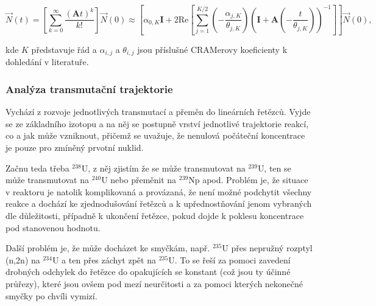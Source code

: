 $$ \vec{N}(t) = \left [ \sum_{k=0}^\infty \dfrac{(\textbf{A}t)^k}{k!} \right ] \vec{N}(0) \approx \left [ \alpha_{0,K} \textbf{I} + 2 \text{Re} \left [ \sum_{j=1}^{K/2} \left ( -\dfrac{\alpha_{j,K}}{\theta_{j,K}} \right ) \left ( \textbf{I} + \textbf{A} \left ( -\dfrac{t}{\theta_{j,K}} \right ) \right ) ^{-1} \right ] \right ] \vec{N}(0), $$

kde $K$ představuje řád a $\alpha_{i,j}$ a $\theta_{i,j}$ jsou příslušné CRAMerovy koeficienty k dohledání v literatuře.

\subsubsection{Analýza transmutační trajektorie}

Vychází z rozvoje jednotlivých transmutací a přeměn do lineárních řetězců. Vyjde se ze základního izotopu a na něj se postupně vrství jednotlivé trajektorie reakcí, co a jak může vzniknout, přičemž se uvažuje, že nenulová počáteční koncentrace je pouze pro zmíněný prvotní nuklid.

Začnu teda třeba $^{238}$U, z něj zjistím že se může transmutovat na $^{239}$U, ten se může transmutovat na $^{240}$U nebo přeměnit na $^{239}$Np apod. Problém je, že situace v reaktoru je natolik komplikovaná a provázaná, že není možné podchytit všechny reakce a dochází ke zjednodušování řetězců a k upřednostňování jenom vybraných dle důležitosti, případně k ukončení řetězce, pokud dojde k poklesu koncentrace pod stanovenou hodnotu.

Další problém je, že může docházet ke smyčkám, např. $^{235}$U přes nepružný rozptyl (n,2n) na $^{234}$U a ten přes záchyt zpět na $^{235}$U. To se řeší za pomoci zavedení drobných odchylek do řetězce do opakujících se konstant (což jsou ty účinné průřezy), které jsou ovšem pod mezí neurčitosti a za pomoci kterých nekonečné smyčky po chvíli vymizí.